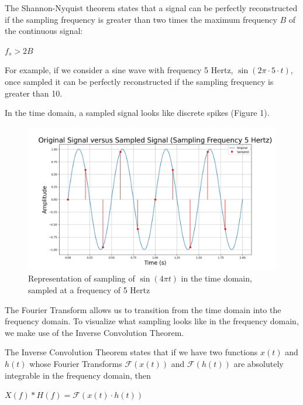 \documentclass{article}
\begin{document}
The Shannon-Nyquist theorem states that a signal can be perfectly reconstructed if the sampling frequency is greater than two times the maximum frequency $B$ of the continuous signal:
\begin{center}
    \begin{math}
        f_s > 2B
    \end{math}  
\end{center}
For example, if we consider a sine wave with frequency 5 Hertz, $\sin(2\pi \cdot 5 \cdot t)$, once sampled it can be perfectly reconstructed if the sampling frequency is greater than 10.


In the time domain, a sampled signal looks like discrete spikes (Figure 1). 
\begin{figure}
    \includegraphics[width=\linewidth]{ogvssampled_BIG.png}
    \caption{Representation of sampling of $\sin(4\pi t)$ in the time domain, sampled at a frequency of 5 Hertz}
    \label{fig:grid}

\end{figure}
The Fourier Transform allows us to transition from the time domain into the frequency domain. To visualize what sampling looks like in the frequency domain, we make use of the Inverse Convolution Theorem.

The Inverse Convolution Theorem states that if we have two functions $x(t)$ and $h(t)$ whose Fourier Transforms $\mathcal{F}(x(t))$ and $\mathcal{F}(h(t))$ are absolutely integrable in the frequency domain,
then 
\begin{center}
    \begin{math}
        X(f) * H(f) = \mathcal{F}\left(x(t) \cdot h(t)\right)
    \end{math}  
\end{center}
\end{document}
